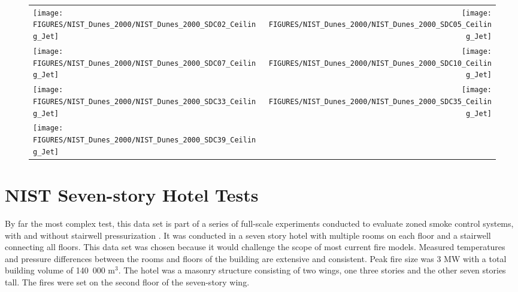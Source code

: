 \begin{figure}[h!]
\begin{tabular*}{\textwidth}{l@{\extracolsep{\fill}}r}
\texttt{[image: FIGURES/NIST\_Dunes\_2000/NIST\_Dunes\_2000\_SDC02\_Ceiling\_Jet]} &
\texttt{[image: FIGURES/NIST\_Dunes\_2000/NIST\_Dunes\_2000\_SDC05\_Ceiling\_Jet]} \\
\texttt{[image: FIGURES/NIST\_Dunes\_2000/NIST\_Dunes\_2000\_SDC07\_Ceiling\_Jet]} &
\texttt{[image: FIGURES/NIST\_Dunes\_2000/NIST\_Dunes\_2000\_SDC10\_Ceiling\_Jet]} \\
\texttt{[image: FIGURES/NIST\_Dunes\_2000/NIST\_Dunes\_2000\_SDC33\_Ceiling\_Jet]} &
\texttt{[image: FIGURES/NIST\_Dunes\_2000/NIST\_Dunes\_2000\_SDC35\_Ceiling\_Jet]} \\
\texttt{[image: FIGURES/NIST\_Dunes\_2000/NIST\_Dunes\_2000\_SDC39\_Ceiling\_Jet]}
\end{tabular*}
\label{NIST_Dunes_2000_Ceiling_Jet}
\end{figure}

\clearpage

\section{NIST Seven-story Hotel Tests}

By far the most complex test, this data set is part of  a series of full-scale experiments conducted to evaluate zoned smoke control systems, with and without stairwell pressurization \cite{Klote:1990}.  It was conducted in a seven story hotel with multiple rooms on each floor and a stairwell connecting all floors.  This data set was chosen because it would challenge the scope of most current fire models.  Measured temperatures and pressure differences between the rooms and floors of the building are extensive and consistent.  Peak fire size was 3 MW with a total building volume of 140~000 m$^3$. The hotel was a masonry structure consisting of two wings, one three stories and the other seven stories tall. The fires were set on the second floor of the seven-story wing. 

